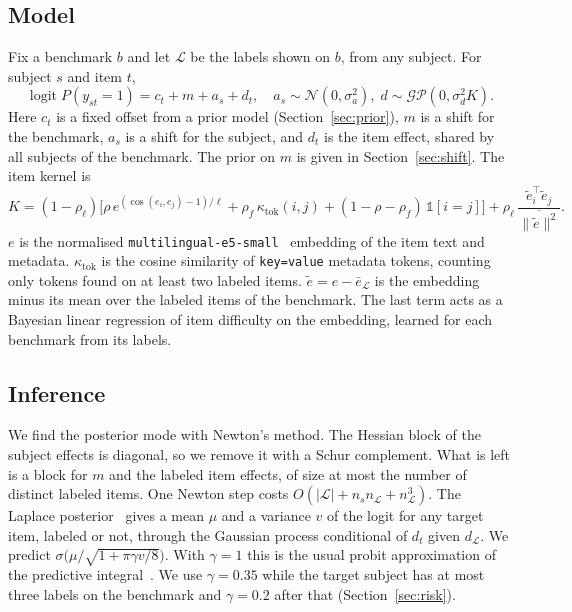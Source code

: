 \documentclass{article}
\begin{document}
\subsection{Model}
Fix a benchmark $b$ and let $\mathcal{L}$ be the labels shown on $b$, from any subject. For subject $s$ and item $t$,
\begin{equation}
\operatorname{logit} P(y_{st}=1) = c_t + m + a_s + d_t,\quad
a_s\sim\mathcal{N}(0,\sigma_a^2),\; d\sim\mathcal{GP}(0,\sigma_d^2 K).
\end{equation}
Here $c_t$ is a fixed offset from a prior model (Section~\ref{sec:prior}), $m$ is a shift for the benchmark, $a_s$ is
a shift for the subject, and $d_t$ is the item effect, shared by all subjects of the benchmark. The prior on $m$ is
given in Section~\ref{sec:shift}. The item kernel is
\begin{equation}
K = (1-\rho_\ell)\big[\rho\,e^{(\cos(e_i,e_j)-1)/\ell} + \rho_f\,\kappa_{\text{tok}}(i,j) + (1-\rho-\rho_f)\,\mathbb{1}[i=j]\big]
  + \rho_\ell\,\frac{\tilde e_i^\top \tilde e_j}{\overline{\|\tilde e\|^2}}.
\end{equation}
$e$ is the normalised \texttt{multilingual-e5-small}~\citep{wang2024multilingual} embedding of the item text and
metadata. $\kappa_{\text{tok}}$ is the cosine similarity of \texttt{key=value} metadata tokens, counting only tokens
found on at least two labeled items. $\tilde e = e-\bar e_{\mathcal{L}}$ is the embedding minus its mean over the
labeled items of the benchmark. The last term acts as a Bayesian linear regression of item difficulty on the
embedding, learned for each benchmark from its labels.

\subsection{Inference}
We find the posterior mode with Newton's method. The Hessian block of the subject effects is diagonal, so we remove it
with a Schur complement. What is left is a block for $m$ and the labeled item effects, of size at most the number of
distinct labeled items. One Newton step costs $O(|\mathcal{L}| + n_s n_{\mathcal{L}} + n_{\mathcal{L}}^3)$. The
Laplace posterior~\citep[Chapter~3]{rasmussen2006gaussian} gives a mean $\mu$ and a variance $v$ of the logit for any
target item, labeled or not, through the Gaussian process conditional of $d_t$ given $d_{\mathcal{L}}$. We predict
$\sigma\big(\mu/\sqrt{1+\pi\gamma v/8}\big)$. With $\gamma=1$ this is the usual probit approximation of the predictive
integral~\citep{mackay1992evidence}. We use $\gamma=0.35$ while the target subject has at most three labels on the
benchmark and $\gamma=0.2$ after that (Section~\ref{sec:risk}).
\end{document}
